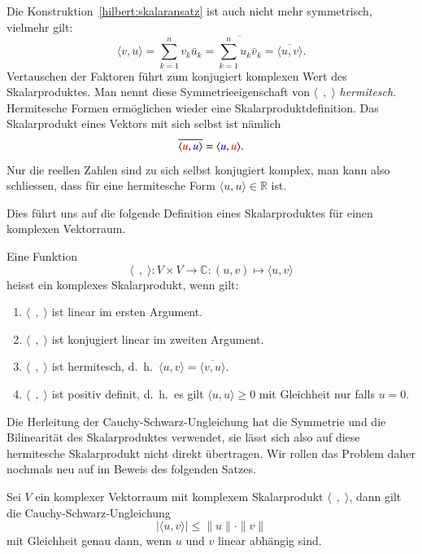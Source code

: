 Die Konstruktion~\eqref{hilbert:skalaransatz} ist auch nicht mehr
symmetrisch, vielmehr gilt:
\[
\langle v,u\rangle
=
\sum_{k=1}^n v_k\bar{u}_k
=
\overline{\sum_{k=1}^n u_k\bar{v}_k}
=
\overline{\langle u,v\rangle}.
\]
Vertauschen der Faktoren führt zum konjugiert komplexen Wert des
Skalarproduktes.
Man nennt diese Symmetrieeigenschaft von $\langle\;\,,\;\rangle$
{\em hermitesch}.
Hermitesche Formen ermöglichen wieder eine Skalarproduktdefinition.
Das Skalarprodukt eines Vektors mit sich selbst ist nämlich
\[
\overline{\langle {\color{red}u},{\color{blue}u}\rangle}
=
\langle {\color{blue}u},{\color{red}u}\rangle.
\]
Nur die reellen Zahlen sind zu sich selbst konjugiert komplex, man kann
also schliessen, dass für eine hermitesche Form
$\langle u,u\rangle\in\mathbb R$ ist.

Dies führt uns auf die folgende Definition eines Skalarproduktes für einen
komplexen Vektorraum.
%
%
\begin{definition}
Eine Funktion
\[
\langle\;\,,\;\rangle
\colon V\times V\to \mathbb C : (u,v) \mapsto \langle u,v\rangle
\]
heisst ein komplexes Skalarprodukt, wenn gilt:
\begin{enumerate}
\item $\langle \;\,,\;\rangle$ ist linear im ersten Argument.
\item $\langle \;\,,\;\rangle$ ist konjugiert linear im zweiten Argument.
\item $\langle\;\,,\;\rangle$ ist hermitesch,
d.~h.~$\langle u,v\rangle=\overline{\langle v,u\rangle}$.
\item $\langle \;\,,\;\rangle$ ist positiv definit, d.~h.~es gilt
$\langle u,u\rangle \ge 0$ mit Gleichheit nur falls $u=0$.
\end{enumerate}
\end{definition}

Die Herleitung der Cauchy-Schwarz-Ungleichung hat die Symmetrie
%
und die Bilinearität des Skalarproduktes verwendet, sie lässt sich
also auf diese hermitesche Skalarprodukt nicht direkt übertragen.
Wir rollen das Problem daher nochmals neu auf im Beweis des folgenden
Satzes.

\begin{satz}
Sei $V$ ein komplexer Vektorraum mit komplexem Skalarprodukt
$\langle\;\,,\;\rangle$,
dann gilt die Cauchy-Schwarz-Ungleichung
\[
|\langle u,v\rangle| \le \|u\|\cdot \|v\|
\]
mit Gleichheit genau dann, wenn $u$ und $v$ linear abhängig sind.
\end{satz}

